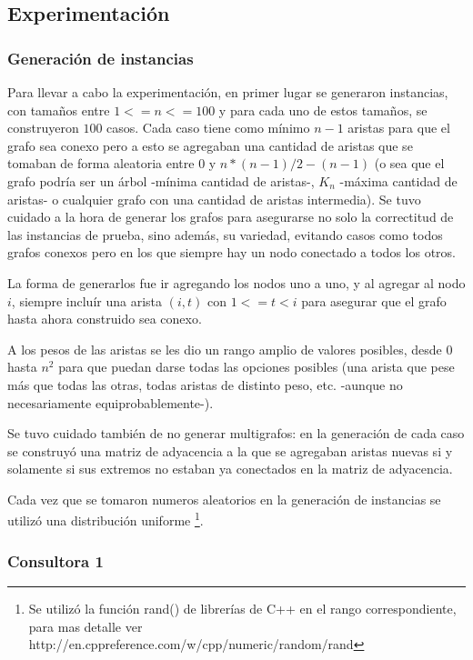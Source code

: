 \documentclass[A4paper,oneside,fleqn,11pt]{article}
\theoremstyle{definition}
\begin{document}
\subsection{Experimentación}

\subsubsection{Generación de instancias}
Para llevar a cabo la experimentación, en primer lugar se generaron instancias, con tamaños entre $1<=n<=100$ y para cada uno de estos tamaños, se construyeron $100$ casos. Cada caso tiene como mínimo $n-1$ aristas para que el grafo sea conexo pero a esto se agregaban una cantidad de aristas que se tomaban de forma aleatoria entre $0$ y $n*(n-1)/2 - (n-1)$  (o sea que el grafo podría ser un árbol -mínima cantidad de aristas-, $K_{n}$ -máxima cantidad de aristas- o cualquier grafo con una cantidad de aristas intermedia). Se tuvo cuidado a la hora de generar los grafos para asegurarse no solo la correctitud de las instancias de prueba, sino además, su variedad, evitando casos como todos grafos conexos pero en los que siempre hay un nodo conectado a todos los otros.

La forma de generarlos fue ir agregando los nodos uno a uno, y al agregar al nodo $i$, siempre incluír una arista $(i,t)$ con $1<=t<i$ para asegurar que el grafo hasta ahora construido sea conexo.

A los pesos de las aristas se les dio un rango amplio de valores posibles, desde $0$ hasta $n^2$ para que puedan darse todas las opciones posibles (una arista que pese más que todas las otras, todas aristas de distinto peso, etc. -aunque no necesariamente equiprobablemente-).

Se tuvo cuidado también de no generar multigrafos: en la generación de cada caso se construyó una matriz de adyacencia a la que se agregaban aristas nuevas si y solamente si sus extremos no estaban ya conectados en la matriz de adyacencia.

Cada vez que se tomaron numeros aleatorios en la generación de instancias se utilizó una distribución uniforme 
\footnote{ Se utilizó la función rand() de librerías de C++ en el rango correspondiente, para mas detalle ver http://en.cppreference.com/w/cpp/numeric/random/rand }.


\subsubsection{Consultora 1}
\end{document}
